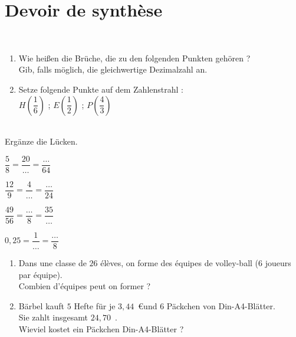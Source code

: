 \documentclass[10pt,openany]{book}
\begin{document}
\section*{Devoir de synth\`ese}

\begin{multicols}{2}
\\
\begin{enumerate}
\item Wie hei\ss en die Br\"uche, die zu den folgenden Punkten geh\"oren ?\\
  Gib, falls m\"oglich, die gleichwertige Dezimalzahl an.
  
      \begin{DroiteGraduee}[none]{8}{0}{13}{1}{1}{0}{0}
\end{DroiteGraduee}

\columnbreak
\item Setze folgende Punkte auf dem Zahlenstrahl : \\
$H(\dfrac{1}{6})$ ; $E(\dfrac{1}{2})$ ; $P(\dfrac{4}{3})$

\begin{DroiteGraduee}[none]{8}{0}{13}{1}{1}{0}{0}
\end{DroiteGraduee}

\end{enumerate}

\end{multicols}

\\
Erg\"anze die L\"ucken.\\
\begin{multicols}{4}
$\dfrac{5}{8}=\dfrac{20}{\ldots}=\dfrac{\ldots}{64}$

\columnbreak

$\dfrac{12}{9}=\dfrac{4}{\ldots}=\dfrac{\ldots}{24}$
\columnbreak

$\dfrac{49}{56}=\dfrac{\ldots}{8}=\dfrac{35}{\ldots}$

\columnbreak

$0,25=\dfrac{1}{\ldots}=\dfrac{\ldots}{8}$

\end{multicols}

\begin{enumerate}
\item Dans une classe de $26$ \'el\`eves, on forme des \'equipes de volley-ball ($6$ joueurs par \'equipe).\\
Combien d'\'equipes peut on former ?

\item B\"arbel kauft $5$ Hefte f\"ur  je $3,44$~\euro und $6$ P\"ackchen von Din-A4-Bl\"atter.\\
Sie zahlt insgesamt $24,70$~\eurosans.\\
Wieviel kostet ein P\"ackchen Din-A4-Bl\"atter ?
\end{enumerate}
\end{document}
